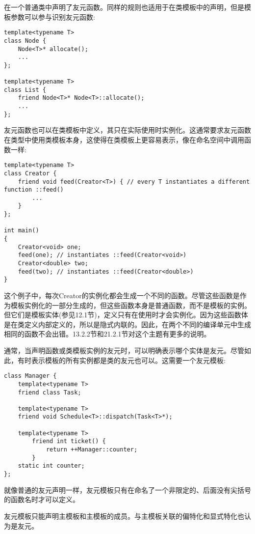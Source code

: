 在一个普通类中声明了友元函数。同样的规则也适用于在类模板中的声明，但是模板参数可以参与识别友元函数:

\begin{lstlisting}[style=styleCXX]
template<typename T>
class Node {
	Node<T>* allocate();
	...
};

template<typename T>
class List {
	friend Node<T>* Node<T>::allocate();
	...
};
\end{lstlisting}

友元函数也可以在类模板中定义，其只在实际使用时实例化。这通常要求友元函数在类型中使用类模板本身，这使得在类模板上更容易表示，像在命名空间中调用函数一样:

\begin{lstlisting}[style=styleCXX]
template<typename T>
class Creator {
	friend void feed(Creator<T>) { // every T instantiates a different function ::feed()
		...
	}
};

int main()
{
	Creator<void> one;
	feed(one); // instantiates ::feed(Creator<void>)
	Creator<double> two;
	feed(two); // instantiates ::feed(Creator<double>)
}
\end{lstlisting}

这个例子中，每次Creator的实例化都会生成一个不同的函数。尽管这些函数是作为模板实例化的一部分生成的，但这些函数本身是普通函数，而不是模板的实例。但它们是模板实体(参见12.1节)，定义只有在使用时才会实例化。因为这些函数体是在类定义内部定义的，所以是隐式内联的。因此，在两个不同的编译单元中生成相同的函数不会出错。13.2.2节和21.2.1节对这个主题有更多的说明。


通常，当声明函数或类模板实例的友元时，可以明确表示哪个实体是友元。尽管如此，有时表示模板的所有实例都是类的友元也可以。这需要一个友元模板:

\begin{lstlisting}[style=styleCXX]
class Manager {
	template<typename T>
	friend class Task;
	
	template<typename T>
	friend void Schedule<T>::dispatch(Task<T>*);
	
	template<typename T>
		friend int ticket() {
			return ++Manager::counter;
		}
	static int counter;
};
\end{lstlisting}

就像普通的友元声明一样，友元模板只有在命名了一个非限定的、后面没有尖括号的函数名时才可以定义。

友元模板只能声明主模板和主模板的成员。与主模板关联的偏特化和显式特化也认为是友元。








